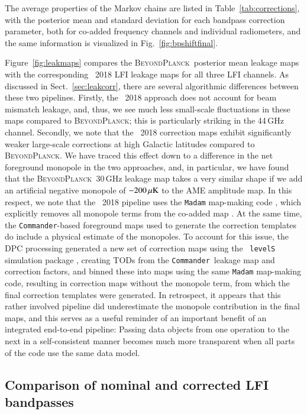 \documentclass[twocolumn]{aa}
\def\commander{\texttt{Commander}}
\newcommand{\BP}{\textsc{BeyondPlanck}}
\newcommand{\?}[1]{\textcolor{red}{{\bf [#1]}}}
\begin{document}
The average properties of the Markov chains are listed in
Table~\ref{tab:corrections}, with the posterior mean and standard
deviation for each bandpass correction parameter, both for co-added
frequency channels and individual radiometers, and the same
information is visualized in Fig.~\ref{fig:bpshiftfinal}.

Figure~\ref{fig:leakmaps} compares the \BP\ posterior mean leakage
maps with the corresponding \Planck\ 2018 LFI leakage maps for all
three LFI channels. As discussed in Sect.~\ref{sec:leakcorr}, there
are several algorithmic differences between these two
pipelines. Firstly, the \Planck\ 2018 approach does not account for beam
mismatch leakage, and, thus, we see much less small-scale fluctuations
in these maps compared to \BP; this is particularly striking in the
44\,GHz channel.
Secondly, we note that the \Planck\ 2018 correction maps exhibit
significantly weaker large-scale corrections at high Galactic
latitudes compared to \BP. We have traced this effect down to a
difference in the net foreground monopole in the two approaches, and,
in particular, we have found that the \BP\ 30\,GHz leakage map takes a
very similar shape if we add an artificial negative monopole of
$-200\muK$ to the AME amplitude map. In this respect, we note that the
\Planck\ 2018 pipeline uses the \texttt{Madam} map-making code
\citep{keihanen2005}, which explicitly removes all monopole terms from
the co-added map \citep{planck2016-l02}. At the same time, the
\commander-based foreground maps used to generate the correction
templates do include a physical estimate of the monopoles. To account
for this issue, the DPC processing generated a new set of correction
maps using the \Planck\ \texttt{levelS} simulation package
\citep{reinecke2006}, creating TODs from the \commander\ leakage map
and correction factors, and binned these into maps using the same
\texttt{Madam} map-making code, resulting in correction maps without
the monopole term, from which the final correction templates were
generated. In retrospect, it appears that this rather involved
pipeline did underestimate the monopole contribution in the final
maps, and this serves as a useful reminder of an important benefit of
an integrated end-to-end pipeline: Passing data objects from one
operation to the next in a self-consistent manner becomes much more
transparent when all parts of the code use the same data model. 

\subsection{Comparison of nominal and corrected LFI bandpasses}
\end{document}
